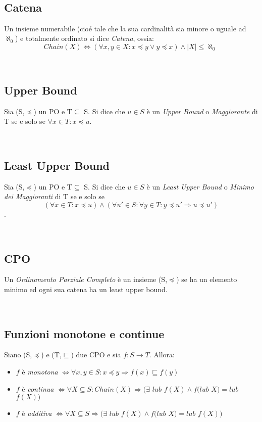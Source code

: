 \documentclass[a4paper, 10pt]{article} %
\begin{document}
\
\subsection{Catena}
\begin{definizione}[Catena]
  Un insieme numerabile (cioé tale che la sua cardinalità sia minore o uguale ad $\aleph_0 $) e totalmente ordinato si dice \emph{Catena}, ossia:
  $$ Chain(X) \Longleftrightarrow (\forall x,y \in X : x \preceq y \vee y \preceq x) \land |X| \leq \aleph_0 \ $$
\end{definizione}

\
\subsection{Upper Bound}
\begin{definizione}
  Sia (S,$\preceq$) un PO e T$\subseteq$ S. Si dice che $u \in S$ è un \emph{Upper Bound} o \emph{Maggiorante} di T se e solo se $ \forall x \in T : x \preceq u $.
\end{definizione}

\
\subsection{Least Upper Bound}
\begin{definizione}[Least Upper Bound]
  Sia (S,$\preceq$) un PO e T$\subseteq$ S. Si dice che $u \in S$ è un \emph{Least Upper Bound} o \emph{Minimo dei Maggioranti} di T se e solo se $$( \forall x \in T : x \preceq u ) \land (\forall u' \in S : \forall y \in T : y \preceq u' \Rightarrow u \preceq u') $$.
\end{definizione}

\
\subsection{CPO}
\begin{definizione}[CPO]
  Un \emph{Ordinamento Parziale Completo} è un insieme (S,$\preceq$) se ha un elemento minimo ed ogni sua catena ha un least upper bound.
\end{definizione}

\
\subsection{Funzioni monotone e continue}
\begin{definizione}
  Siano (S,$\preceq$) e (T,$\sqsubseteq$) due CPO e sia $ f:S\rightarrow T$. Allora:
  \begin{itemize}
  \item $f$ è \emph{monotona} $\Leftrightarrow \forall x,y \in S :
    x \preceq y \Rightarrow f(x) \sqsubseteq f(y)$
  \item $f$ è \emph{continua} $\Leftrightarrow \forall X \subseteq S : Chain(X) \Rightarrow (\exists$ $lub$ $f(X) \land f(lub$ $X) = lub$ $f(X))$
  \item $f$ è \emph{additiva} $\Leftrightarrow \forall X \subseteq S \Rightarrow (\exists$ $lub$ $f(X) \land f(lub$ $X) = lub$ $f(X))$
  \end{itemize}
\end{definizione}
\end{document}
